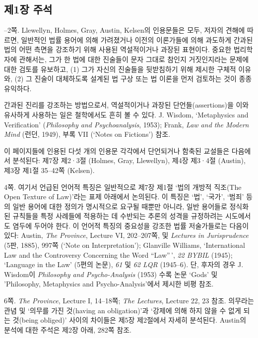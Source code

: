 {\subsection{제1장 주석}\label{uxc81c1uxc7a5-uxc8fcuxc11d}

--2쪽. Llewellyn, Holmes, Gray, Austin, Kelsen의 인용문들은 모두,
저자의 견해에 따르면, 일반적인 법률 용어에 의해 가려졌거나 이전의
이론가들에 의해 과도하게 간과된 법의 어떤 측면을 강조하기 위해 사용된
역설적이거나 과장된 표현이다. 중요한 법리학자에 관해서는, 그가 한 법에
대한 진술들이 문자 그대로 참인지 거짓인지라는 문제에 대한 검토를
유보하고, (1) 그가 자신의 진술들을 뒷받침하기 위해 제시한 구체적 이유와,
(2) 그 진술이 대체하도록 설계된 법 구상 또는 법 이론을 먼저 검토하는
것이 종종 유익하다.

간과된 진리를 강조하는 방법으로서, 역설적이거나 과장된
단언들(assertions)을 이와 유사하게 사용하는 일은 철학에서도 흔히 볼 수
있다. J. Wisdom, `Metaphysics and Verification' (\emph{Philosophy and
Psychoanalysis}, 1953); Frank, \emph{Law and the Modern Mind} (런던,
1949), 부록 VII (`Notes on Fictions') 참조.

이 페이지들에 인용된 다섯 개의 인용문 각각에서 단언되거나 함축된
교설들은 다음에서 분석된다: 제7장 제2·3절 (Holmes, Gray, Llewellyn),
제4장 제3·4절 (Austin), 제3장 제1절 35--42쪽 (Kelsen).

\noteentry 4쪽.  여기서 언급된 언어적 특징은
일반적으로 제7장 제1절 ‘법의 개방적 직조(The Open Texture of Law)’라는
표제 아래에서 논의된다. 이 특징은 ‘법’, ‘국가’, ‘범죄’ 등의 일반 용어에
대한 정의가 명시적으로 요구될 때뿐만 아니라, 일반 용어들로 정식화된
규칙들을 특정 사례들에 적용하는 데 수반되는 추론의 성격을 규정하려는
시도에서도 염두에 두어야 한다. 이 언어적 특징의 중요성을 강조한 법률
저술가들로는 다음이 있다: Austin, \emph{The Province}, Lecture VI,
202--207쪽, 및 \emph{Lectures in Jurisprudence} (5판, 1885), 997쪽
(`Note on Interpretation'); Glanville Williams, `International Law and
the Controversy Concerning the Word “Law”\,', \emph{22 BYBIL} (1945);
`Language in the Law' (5편의 논문), \emph{61} 및 \emph{62 LQR}
(1945--6). 단, 후자의 경우 J. Wisdom이 \emph{Philosophy and
Psycho-Analysis} (1953) 수록 논문 `Gods' 및 'Philosophy, Metaphysics and
Psycho-Analysis'에서 제시한 비평 참조.

\noteentry 6쪽.  \emph{The Province}, Lecture I,
14--18쪽; \emph{The Lectures}, Lecture 22, 23 참조. 의무라는 관념 및
‘의무를 가진 것(having an obligation)’과 ‘강제에 의해 하지 않을 수 없게
되는 것(being obliged)’ 사이의 차이들은 제5장 제2절에서 자세히 분석된다.
Austin의 분석에 대한 주석은 제2장 아래, 282쪽 참조.

}
